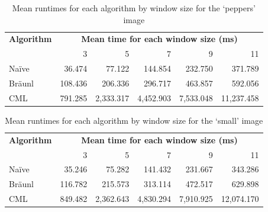 \begin{table}
\centering
\caption{
\label{tab:peppers}Mean runtimes for each algorithm by window size for the `peppers' image}
\begin{tabular}{@{}lrrrrr@{}}
\toprule
\multicolumn{1}{c}{\textbf{Algorithm}} & \multicolumn{5}{c}{\textbf{Mean time for each window size (ms)}}  \\
                              & 3       & 5         & 7         & 9         & 11         \\ \midrule
Naïve                         & 36.474  & 77.122    & 144.854   & 232.750   & 371.789    \\
Bräunl                        & 108.436 & 206.336   & 296.717   & 463.857   & 592.056    \\
CML                           & 791.285 & 2,333.317 & 4,452.903 & 7,533.048 & 11,237.458 \\ \bottomrule
\end{tabular}
\end{table}

\begin{table}
\centering
\caption{Mean runtimes for each algorithm by window size for the `small' image}
\label{tab:small}
\begin{tabular}{@{}lrrrrr@{}}
\toprule
\multicolumn{1}{c}{\textbf{Algorithm}} & \multicolumn{5}{c}{\textbf{Mean time for each window size (ms)}}  \\
                              & 3       & 5         & 7         & 9         & 11         \\ \midrule
Naïve                         & 35.246  & 75.282    & 141.432   & 231.667   & 343.286    \\
Bräunl                        & 116.782 & 215.573   & 313.114   & 472.517   & 629.898    \\
CML                           & 849.482 & 2,362.643 & 4,830.294 & 7,910.925 & 12,074.170 \\ \bottomrule
\end{tabular}
\end{table}

